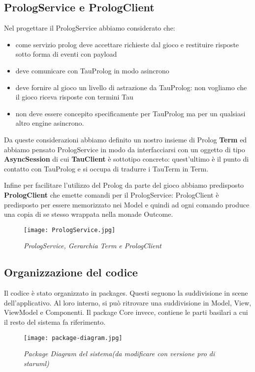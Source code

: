 \subsection{PrologService e PrologClient}
Nel progettare il PrologService abbiamo considerato che:
\begin{itemize}
    \item come servizio prolog deve accettare richieste dal gioco e restituire risposte sotto forma di eventi con payload
    \item deve comunicare con TauProlog in modo asincrono
    \item deve fornire al gioco un livello di astrazione da TauProlog: non vogliamo che il gioco riceva risposte con termini Tau
    \item non deve essere concepito specificamente per TauProlog ma per un qualsiasi altro engine asincrono.
\end{itemize}   

Da queste considerazioni abbiamo definito un nostro insieme di Prolog \textbf{Term} ed abbiamo pensato PrologService in modo da interfacciarsi con un oggetto di tipo \textbf{AsyncSession} di cui \textbf{TauClient} è sottotipo concreto: quest'ultimo è il punto di contatto con TauProlog e si occupa di tradurre i TauTerm in Term.

Infine per facilitare l'utilizzo del Prolog da parte del gioco abbiamo predisposto \textbf{PrologClient} che emette comandi per il PrologService: PrologClient è predisposto per essere memorizzato nei Model e quindi ad ogni comando produce una copia di se stesso wrappata nella monade Outcome.

\begin{figure}[!hbt]
    \centering
    \texttt{[image: PrologService.jpg]}
    \caption{\textit{PrologService, Gerarchia Term e PrologClient}} 
\end{figure}

\subsection{Organizzazione del codice}
Il codice è stato organizzato in packages. Questi seguono la suddivisione in scene dell'applicativo. Al loro interno, si può ritrovare una suddivisione in Model, View, ViewModel e Componenti.
Il package Core invece, contiene le parti basilari a cui il resto del sistema fa riferimento.

\begin{figure}[!hbt]
    \centering
    \texttt{[image: package-diagram.jpg]}
    \caption{\textit{Package Diagram del sistema(da modificare con versione pro di staruml)}} 
\end{figure}